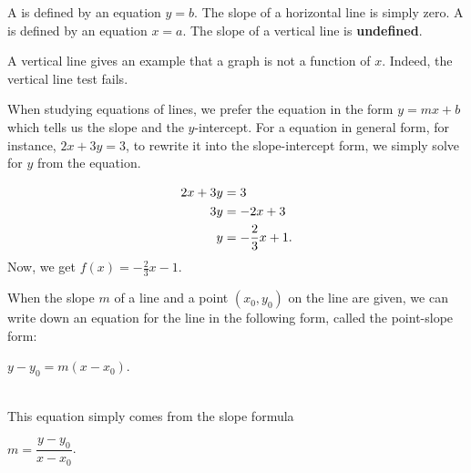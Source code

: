 
\begin{tcolorbox}[colback=white,colframe=cyan, title filled=false, coltitle=cyan, enhanced, attach boxed title to top center={yshift=-3mm,yshifttext=-1mm}, fonttitle=\bfseries, boxed title style={size=small,colback=white}, before upper={\parindent15pt},
title={Horizontal and vertical lines}]
A  is defined by an equation $y=b$. The slope of a horizontal line is simply zero.
A  is defined by an equation $x=a$. The slope of a vertical line is \textbf{undefined}. 

A vertical line gives an example that a graph is not a function of $x$. Indeed, 
the vertical line test fails. 



\end{tcolorbox}

\begin{tcolorbox}[colback=white,colframe=cyan, title filled=false, coltitle=cyan, enhanced, attach boxed title to top center={yshift=-3mm,yshifttext=-1mm}, fonttitle=\bfseries, boxed title style={size=small,colback=white}, before upper={\parindent15pt},
title={Get the explicit function from an equation}]
\begin{multicols}{2}
When studying equations of lines, we prefer the equation in the form $y=mx+b$ which tells us the slope and the $y$-intercept.  For a equation in general form, for instance, $2x+3y=3$, to rewrite it into the slope-intercept form, we simply solve for $y$ from the equation.

\columnbreak

\mbox{}
\vspace*{-1em}
\[\begin{split}
2x+3y&=3\\
3y&=-2x+3\\
y&=-\frac23x+1. \vspace*{-1em}
\end{split}\]
Now, we get $f(x)=-\frac23x-1$.
\end{multicols}


\end{tcolorbox}



\begin{tcolorbox}[colback=white,colframe=cyan, title filled=false, coltitle=cyan, enhanced, attach boxed title to top center={yshift=-3mm,yshifttext=-1mm}, fonttitle=\bfseries, boxed title style={size=small,colback=white}, before upper={\parindent15pt},
title={Point-slope form equation of a line}]

When the slope $m$ of a line and a point $(x_0, y_0)$ on the line are given, we can write down an equation for the line in the following form, called the point-slope form:\\
\centerline{$y-y_0=m(x-x_0)$.}\\ 
This equation simply comes from the slope formula\\
\centerline{$m=\dfrac{y-y_0}{x-x_0}$.}\\ 
\end{tcolorbox}



